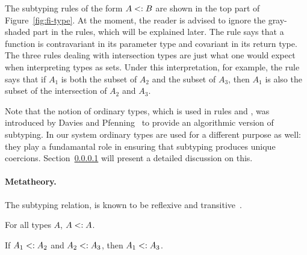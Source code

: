 
The subtyping rules of the form $A <: B$ are shown in the top part of
Figure~\ref{fig:fi-type}. At the moment, the reader is advised to ignore the
gray-shaded part in the rules, which will be explained later. The rule
 says that a function is contravariant in its parameter
type and covariant in its return type. The three rules dealing with
intersection types are just what one would expect when interpreting types as
sets. Under this interpretation, for example, the rule 
says that if $A_1$ is both the subset of $A_2$ and the subset of $A_3$, then
$A_1$ is also the subset of the intersection of $A_2$ and $A_3$.

Note that the notion of ordinary types, which is used in rules
 and , was
introduced by Davies and Pfenning~\cite{} to provide an algorithmic version of
subtyping. In our system ordinary types are used for a different 
purpose as well: they play a fundamantal role in ensuring that 
subtyping produces unique coercions. Section~\ref{} will present 
a detailed discussion on this.

\paragraph{Metatheory.} The subtyping relation, is known to be
reflexive and transitive~\cite{}. 

\begin{lemma} \label{lemma:sub-refl}
  For all types $ A $, $ A <: A $.
\end{lemma}

\begin{lemma} \label{lemma:sub-trans}
  If $ A_1 <: A_2 $ and $ A_2 <: A_3 $,
  then $ A_1 <: A_3 $.
\end{lemma}


